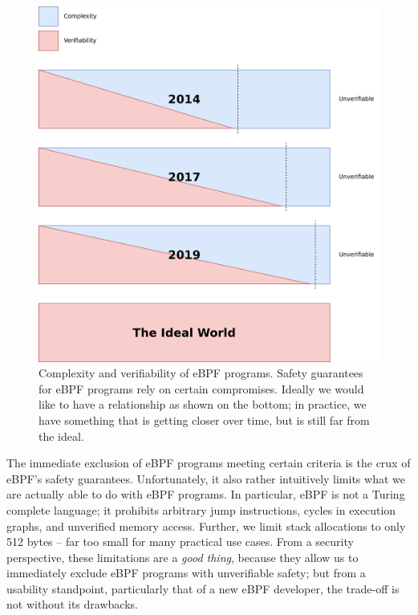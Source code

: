 \documentclass[
  12pt]{findlay}
\begin{document}
\begin{figure}
\begin{center}
\includegraphics{../figures/complexity-verifiability.png}
\end{center}
\caption[Complexity and verifiability of eBPF programs.]
{
Complexity and verifiability of eBPF programs.
Safety guarantees for eBPF programs rely on certain compromises.
Ideally we would like to have a relationship as shown on the bottom;
in practice, we have something that is getting closer over time, but is still
far from the ideal.
}
\label{complexity-verifiability}
\end{figure}

The immediate exclusion of eBPF programs meeting certain criteria is the
crux of eBPF's safety guarantees. Unfortunately, it also rather
intuitively limits what we are actually able to do with eBPF programs.
In particular, eBPF is not a Turing complete language; it prohibits
arbitrary jump instructions, cycles in execution graphs, and unverified
memory access. Further, we limit stack allocations to only 512 bytes --
far too small for many practical use cases. From a security perspective,
these limitations are a \emph{good thing}, because they allow us to
immediately exclude eBPF programs with unverifiable safety; but from a
usability standpoint, particularly that of a new eBPF developer, the
trade-off is not without its drawbacks.
\end{document}
